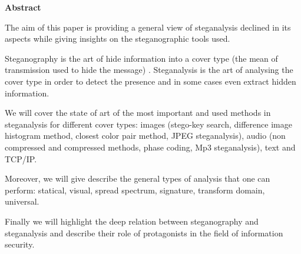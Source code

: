 \documentclass[../../main.tex]{subfiles}
\begin{document}
\begin{center}
    \center \textbf{Abstract}
\end{center}

\vspace{0.1cm}

The aim of this paper is providing a general view of steganalysis declined in its aspects
while giving insights on the steganographic tools used. 

Steganography is the art of hide information into a cover type (the mean of
transmission used to hide the message) \cite{steganography-definition}.
Steganalysis is the art of analysing the cover type in order to detect the presence and in some cases even extract hidden information.

We will cover the state of art of the most important and used methods in
steganalysis for different cover types: images (stego-key search, difference
image histogram method, closest color pair method, JPEG steganalysis), audio
(non compressed and compressed methods, phase coding, Mp3 steganalysis), text
and TCP/IP.

Moreover, we will give describe the general types of analysis that one can
perform: statical, visual, spread spectrum, signature, transform domain,
universal.

Finally we will highlight the deep relation between steganography and steganalysis and describe their 
role of protagonists in the field of information security.
\end{document}
